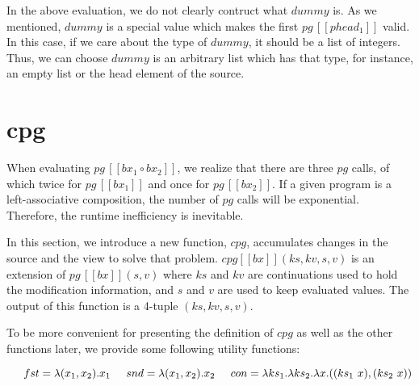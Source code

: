 \documentclass[runningheads]{llncs}
\newcommand{\tab}{\hspace*{5mm}}
\newcommand{\pg}[3]{pg \, [\![#1]\!] (#2, #3)}
\newcommand{\pginline}[1]{pg \, [\![#1]\!]}
\newcommand{\cpg}[5]{cpg [\![#1]\!] (#2, #3, #4, #5)}
\begin{document}
In the above evaluation, we do not clearly contruct what $dummy$ is. As we mentioned, $dummy$ is a special value which makes the first $\pginline{phead_1}$ valid. In this case, if we care about the type of $dummy$, it should be a list of integers. Thus, we can choose $dummy$ is an arbitrary list which has that type, for instance, an empty list or the head element of the source.

\section{cpg}

When evaluating $\pginline{bx_1 \circ bx_2}$, we realize that there are three $pg$ calls, of which twice for $\pginline{bx_1}$ and once for $\pginline{bx_2}$. If a given program is a left-associative composition, the number of $pg$ calls will be exponential. Therefore, the runtime inefficiency is inevitable.

In this section, we introduce a new function, $cpg$, accumulates changes in the source and the view to solve that problem. $\cpg{bx}{ks}{kv}{s}{v}$ is an extension of $\pg{bx}{s}{v}$ where $ks$ and $kv$ are continuations used to hold the modification information, and $s$ and $v$ are used to keep evaluated values. The output of this function is a 4-tuple $(ks, kv, s, v)$.

To be more convenient for presenting the definition of $cpg$ as well as the other functions later, we provide some following utility functions:

$\tab fst = \lambda (x_1,x_2). x_1\\
 \tab snd = \lambda (x_1,x_2). x_2\\
 \tab con = \lambda ks_1. \lambda ks_2. \lambda x. ((ks_1 \ x),(ks_2 \ x))$\\
\end{document}
